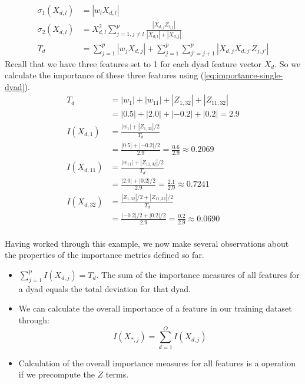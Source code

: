 \documentclass[10pt]{journal}
\begin{document}
\begin{align}
    \sigma_1(X_{d,l})
        &= |w_l X_{d,l}|  \\
    \sigma_2(X_{d,l})
        &= X_{d,l}^2 \sum_{j=1, j \neq l}^p
            \frac{|X_{d,j} Z_{l,j}|}
                 {|X_{d,l}| + |X_{d,j}|}  \\
    T_d
        &= \sum_{j=1}^p |w_j X_{d,j}| +
            \sum_{j=1}^p \sum_{j'=j+1}^p
                |X_{d,j} X_{d,j'} Z_{j,j'}|
\end{align}
%
Recall that we have three features set to 1 for each dyad feature vector $X_d$.
So we calculate the importance of these three features using
(\ref{eq:importance-single-dyad}).
%
\begin{align*}
    T_d
        &= |w_1| + |w_{11}| + |Z_{1,32}| + |Z_{11,32}|  \\
        &= |0.5| + |2.0| + |-0.2| + |0.2| = 2.9  \\[3mm]
    I(X_{d,1})
        &= \frac{|w_1| + |Z_{1,32}| / 2}{T_d}  \\
        &= \frac{|0.5| + |-0.2| / 2}{2.9}
        = \frac{0.6}{2.9} \approx 0.2069  \\[3mm]
    I(X_{d,11})
        &= \frac{|w_{11}| + |Z_{11,32}| / 2}{T_d}  \\
        &= \frac{|2.0| + |0.2| / 2}{2.9}
        = \frac{2.1}{2.9} \approx 0.7241  \\[3mm]
    I(X_{d,32})
        &= \frac{|Z_{1,32}| / 2 + |Z_{11,32}| / 2}{T_d}  \\
        &= \frac{|-0.2| / 2 + |0.2| / 2}{2.9}
         = \frac{0.2}{2.9} \approx 0.0690  \\
\end{align*}

Having worked through this example, we now make several observations about the
properties of the importance metrics defined so far.

\begin{itemize}
    \item  $\sum_{j=1}^p I(X_{d,j}) = T_d$. The sum of the importance measures
        of all features for a dyad equals the total deviation for that dyad.
    \item  We can calculate the overall importance of a feature in our training
        dataset through:
        \begin{equation}
            I(X_{*,j}) = \sum_{d=1}^O I(X_{d,j})
        \end{equation}
    \item  Calculation of the overall importance measures for all features is a
         operation if we precompute the $Z$ terms.
\end{itemize}
\end{document}
